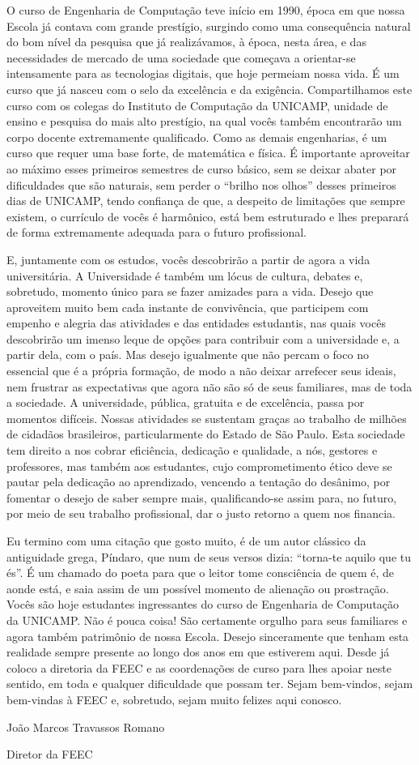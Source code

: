 O curso de Engenharia de Computação teve início em 1990, época em que nossa
Escola já contava com grande prestígio, surgindo como uma consequência natural
do bom nível da pesquisa que já realizávamos, à época, nesta área, e das
necessidades de mercado de uma sociedade que começava a orientar-se intensamente
para as tecnologias digitais, que hoje permeiam nossa vida. É um curso que já
nasceu com o selo da excelência e da exigência. Compartilhamos este curso com os
colegas do Instituto de Computação da UNICAMP, unidade de ensino e pesquisa do
mais alto prestígio, na qual vocês também encontrarão um corpo docente
extremamente qualificado. Como as demais engenharias, é um curso que requer uma
base forte, de matemática e física. É importante aproveitar ao máximo esses
primeiros semestres de curso básico, sem se deixar abater por dificuldades que
são naturais, sem perder o ``brilho nos olhos'' desses primeiros dias de
UNICAMP, tendo confiança de que, a despeito de limitações que sempre existem, o
currículo de vocês é harmônico, está bem estruturado e lhes preparará de forma
extremamente adequada para o futuro profissional.

E, juntamente com os estudos, vocês descobrirão a partir de agora a vida
universitária. A Universidade é também um lócus de cultura, debates e,
sobretudo, momento único para se fazer amizades para a vida. Desejo que
aproveitem muito bem cada instante de convivência, que participem com empenho e
alegria das atividades e das entidades estudantis, nas quais vocês descobrirão
um imenso leque de opções para contribuir com a universidade e, a partir dela,
com o país. Mas desejo igualmente que não percam o foco no essencial que é a
própria formação, de modo a não deixar arrefecer seus ideais, nem frustrar as
expectativas que agora não são só de seus familiares, mas de toda a sociedade.
A universidade, pública, gratuita e de excelência, passa por momentos difíceis.
Nossas atividades se sustentam graças ao trabalho de milhões de cidadãos
brasileiros, particularmente do Estado de São Paulo. Esta sociedade tem direito
a nos cobrar eficiência, dedicação e qualidade, a nós, gestores e professores,
mas também aos estudantes, cujo comprometimento ético deve se pautar pela
dedicação ao aprendizado, vencendo a tentação do desânimo, por fomentar o desejo
de saber sempre mais, qualificando-se assim para, no futuro, por meio de seu
trabalho profissional, dar o justo retorno a quem nos financia.

Eu termino com uma citação que gosto muito, é de um autor clássico da
antiguidade grega, Píndaro, que num de seus versos dizia: ``torna-te aquilo que
tu és''. É um chamado do poeta para que o leitor tome consciência de quem é, de
aonde está, e saia assim de um possível momento de alienação ou prostração.
Vocês são hoje estudantes ingressantes do curso de Engenharia de Computação da
UNICAMP. Não é pouca coisa! São certamente orgulho para seus familiares e agora
também patrimônio de nossa Escola. Desejo sinceramente que tenham esta realidade
sempre presente ao longo dos anos em que estiverem aqui. Desde já coloco a
diretoria da FEEC e as coordenações de curso para lhes apoiar neste sentido, em
toda e qualquer dificuldade que possam ter. Sejam bem-vindos, sejam bem-vindas à
FEEC e, sobretudo, sejam muito felizes aqui conosco.

\begin{flushright}
João Marcos Travassos Romano

Diretor da FEEC
\end{flushright}